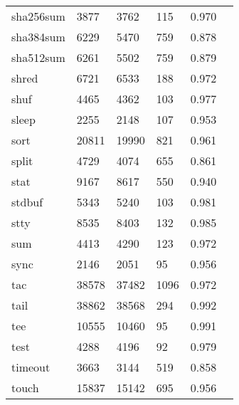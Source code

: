 \begin{longtable}{lp{2.40cm}p{2.40cm}p{2.40cm}p{2.40cm}p{2.40cm}}
sha256sum &                     3877 &         3762 &           115 &                    0.970 \\
sha384sum &                     6229 &         5470 &           759 &                    0.878 \\
sha512sum &                     6261 &         5502 &           759 &                    0.879 \\
shred     &                     6721 &         6533 &           188 &                    0.972 \\
shuf      &                     4465 &         4362 &           103 &                    0.977 \\
sleep     &                     2255 &         2148 &           107 &                    0.953 \\
sort      &                    20811 &        19990 &           821 &                    0.961 \\
split     &                     4729 &         4074 &           655 &                    0.861 \\
stat      &                     9167 &         8617 &           550 &                    0.940 \\
stdbuf    &                     5343 &         5240 &           103 &                    0.981 \\
stty      &                     8535 &         8403 &           132 &                    0.985 \\
sum       &                     4413 &         4290 &           123 &                    0.972 \\
sync      &                     2146 &         2051 &            95 &                    0.956 \\
tac       &                    38578 &        37482 &          1096 &                    0.972 \\
tail      &                    38862 &        38568 &           294 &                    0.992 \\
tee       &                    10555 &        10460 &            95 &                    0.991 \\
test      &                     4288 &         4196 &            92 &                    0.979 \\
timeout   &                     3663 &         3144 &           519 &                    0.858 \\
touch     &                    15837 &        15142 &           695 &                    0.956 \\

\end{longtable}
